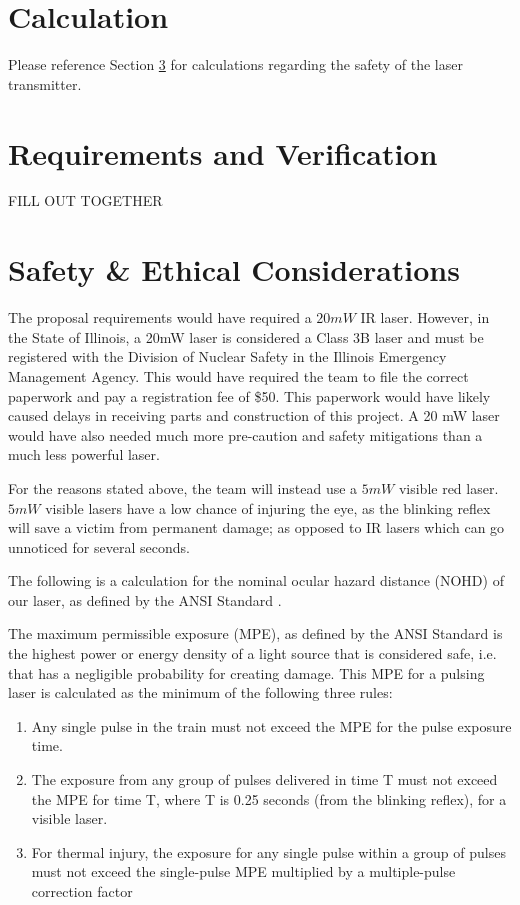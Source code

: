 \documentclass[letterpaper,10pt]{article}
\begin{document}
\begin{spacing}{1.15}
\section{Calculation}
Please reference Section \ref{section-safety-ethics} for calculations regarding the safety of the laser transmitter. 

\section{Requirements and Verification}
FILL OUT TOGETHER

\section{Safety \& Ethical Considerations} \label{section-safety-ethics}
The proposal requirements would have required a $20mW$ IR laser. However, in the State of Illinois, a 20mW laser is considered a Class 3B laser and must be registered with the Division of Nuclear Safety in the Illinois Emergency Management Agency. This would have required the team to file the correct paperwork and pay a registration fee of \$50. This paperwork would have likely caused delays in receiving parts and construction of this project. A 20 mW laser would have also needed much more pre-caution and safety mitigations than a much less powerful laser.

For the reasons stated above, the team will instead use a $5mW$ visible red laser. $5mW$ visible lasers have a low chance of injuring the eye, as the blinking reflex will save a victim from permanent damage; as opposed to IR lasers which can go unnoticed for several seconds. 

The following is a calculation for the nominal ocular hazard distance (NOHD) of our laser, as defined by the ANSI Standard \cite{ANSI}.

The maximum permissible exposure (MPE), as defined by the ANSI Standard \cite{ANSI} is the highest power or energy density of a light source that is considered safe, i.e. that has a negligible probability for creating damage. This MPE for a pulsing laser is calculated as the minimum of the following three rules:

\begin{enumerate}
	\item Any single pulse in the train must not exceed the MPE for the pulse exposure time.
	\item The exposure from any group of pulses delivered in time T must not exceed the MPE for
	time T, where T is 0.25 seconds (from the blinking reflex), for a visible laser. 
	\item For thermal injury, the exposure for any single pulse within a group of pulses must not
	exceed the single-pulse MPE multiplied by a multiple-pulse correction factor
\end{enumerate}


\end{spacing}
\end{document}
